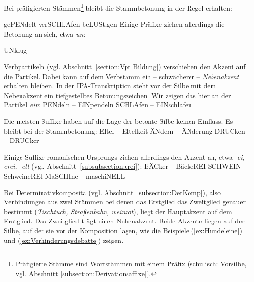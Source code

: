 Bei präfigierten Stämmen\footnote{Präfigierte Stämme sind Wortstämmen mit einem Präfix (schulisch: Vorsilbe, vgl. Abschnitt \ref{subsection:Derivationsaffixe}).} bleibt die Stammbetonung in der Regel erhalten:

\ea
\ea \label{ex:gependelt} gePENdelt 
\ex \label{ex:verschlafen} verSCHLAfen 
\ex \label{ex:belustigen} beLUStigen 
\z 
\z
Einige Präfixe ziehen allerdings die Betonung an sich, etwa \textit{un}:

\ea \label{ea:unklug} UNklug 
\z 

Verbpartikeln (vgl. Abschnitt~\ref{section:Vpt Bildung}) verschieben den Akzent auf die Partikel. Dabei kann auf dem Verbstamm ein -- schwächerer -- \textit{Nebenakzent} erhalten bleiben. In der IPA-Transkription steht vor der Silbe mit dem Nebenakzent ein tiefgestelltes Betonungszeichen. Wir zeigen das hier an der Partikel \textit{ein}:
\ea
\ea \label{ex:einpendeln} PENdeln  -- EINpendeln 
\ex \label{ex:einschlafen} SCHLAfen  -- EINschlafen 
\z 
\z

Die meisten Suffixe haben auf die Lage der betonte Silbe keinen Einfluss. Es bleibt bei der Stammbetonung:
\ea
\ea \label{ex:Eitelkeit} EItel \textipa{[\textprimstress P\t*{aI}.t@l]} -- EItelkeit \textipa{[\textprimstress P\t*{aI}.t@l.k\t*{aI}t]}
\ex \label{ex:aenderung} ÄNdern  -- ÄNderung 
\ex \label{ex:tragbar} DRUCken  -- DRUCker 
\z 
\z

Einige Suffixe romanischen Ursprungs ziehen allerdings den Akzent an, etwa \textit{-ei, -erei, -ell} (vgl. Abschnitt~\ref{subsubsection:erei}):
\ea
\ea \label{ex:Kumpanei} BÄCker \textipa{[\textprimstress bE\.*k5]} -- BäckeREI 
\ex \label{ex:Schweinerei} SCHWEIN \textipa{[Sv\t*{aI}n]}-- SchweineREI 
\ex \label{ex:maschinell} MaSCHIne \textipa{[ma\textprimstress Si:.n@]}-- maschiNELL 
\z 
\z

Bei Determinativkomposita (vgl. Abschnitt~\ref{subsection:DetKomp}), also Verbindungen aus zwei Stämmen bei denen das Erstglied das Zweitglied genauer bestimmt (\zB \textit{Tischtuch, Straßenbahn, weinrot}), liegt der Hauptakzent auf dem Erstglied. Das Zweitglied trägt einen Nebenakzent. Beide Akzente liegen auf der Silbe, auf der sie vor der Komposition lagen, wie die Beispiele (\ref{ex:Hundeleine}) und (\ref{ex:Verhinderungsdebatte}) zeigen.

